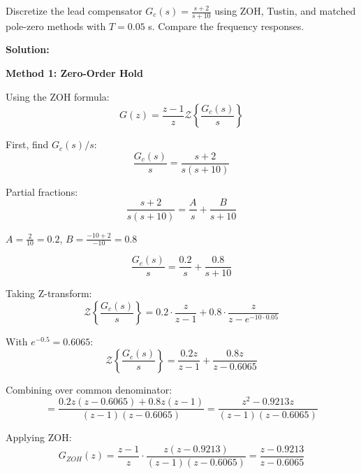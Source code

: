 \begin{example}
\label{ex:discretization_comparison}

Discretize the lead compensator $G_c(s) = \frac{s + 2}{s + 10}$ using ZOH, Tustin, and matched pole-zero methods with $T = 0.05$ s. Compare the frequency responses.

\textbf{Solution:}

\textbf{Method 1: Zero-Order Hold}

Using the ZOH formula:
\begin{equation}
G(z) = \frac{z-1}{z} \mathcal{Z}\left\{\frac{G_c(s)}{s}\right\}
\end{equation}

First, find $G_c(s)/s$:
\begin{equation}
\frac{G_c(s)}{s} = \frac{s+2}{s(s+10)}
\end{equation}

Partial fractions:
\begin{equation}
\frac{s+2}{s(s+10)} = \frac{A}{s} + \frac{B}{s+10}
\end{equation}

$A = \frac{2}{10} = 0.2$, $B = \frac{-10+2}{-10} = 0.8$

\begin{equation}
\frac{G_c(s)}{s} = \frac{0.2}{s} + \frac{0.8}{s+10}
\end{equation}

Taking Z-transform:
\begin{equation}
\mathcal{Z}\left\{\frac{G_c(s)}{s}\right\} = 0.2 \cdot \frac{z}{z-1} + 0.8 \cdot \frac{z}{z-e^{-10 \cdot 0.05}}
\end{equation}

With $e^{-0.5} = 0.6065$:
\begin{equation}
\mathcal{Z}\left\{\frac{G_c(s)}{s}\right\} = \frac{0.2z}{z-1} + \frac{0.8z}{z-0.6065}
\end{equation}

Combining over common denominator:
\begin{equation}
= \frac{0.2z(z-0.6065) + 0.8z(z-1)}{(z-1)(z-0.6065)} = \frac{z^2 - 0.9213z}{(z-1)(z-0.6065)}
\end{equation}

Applying ZOH:
\begin{equation}
G_{ZOH}(z) = \frac{z-1}{z} \cdot \frac{z(z - 0.9213)}{(z-1)(z-0.6065)} = \frac{z - 0.9213}{z - 0.6065}
\end{equation}


\end{example}
